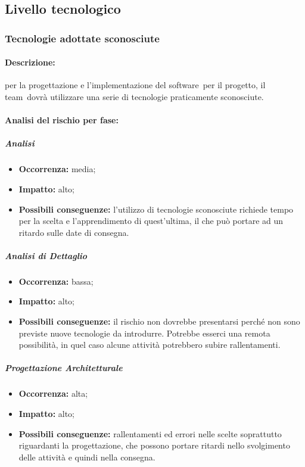 \documentclass[../PianoProgetto.tex]{subfiles}
\begin{document}
\newpage
\subsection{Livello tecnologico}

\subsubsection{Tecnologie adottate sconosciute}
\label{sec:Tecnologie adottate sconosciute}

	\paragraph*{Descrizione:} per la progettazione e l'implementazione del software\g\ per il progetto, il team\g\ dovrà utilizzare una serie di tecnologie praticamente sconosciute.
	
	\paragraph*{Analisi del rischio per fase:} 

		\subparagraph*{Analisi}
			\begin{itemize}[label={-}]
				\item \textbf{Occorrenza:} media;
				\item \textbf{Impatto:} alto;
				\item \textbf{Possibili conseguenze:} l'utilizzo di tecnologie sconosciute richiede tempo per la scelta e l'apprendimento di quest'ultima, il che può portare ad un ritardo sulle date di consegna.
			\end{itemize}
			
		\subparagraph*{Analisi di Dettaglio}
			\begin{itemize}[label={-}]
				\item \textbf{Occorrenza:} bassa;
				\item \textbf{Impatto:} alto;
				\item \textbf{Possibili conseguenze:} il rischio non dovrebbe presentarsi perché non sono previste nuove tecnologie da introdurre. Potrebbe esserci una remota possibilità, in quel caso alcune attività potrebbero subire rallentamenti.
			\end{itemize}
			
		\subparagraph*{Progettazione Architetturale}
			\begin{itemize}[label={-}]
				\item \textbf{Occorrenza:} alta;
				\item \textbf{Impatto:} alto;
				\item \textbf{Possibili conseguenze:} rallentamenti ed errori nelle scelte soprattutto riguardanti la progettazione, che possono portare ritardi nello svolgimento delle attività e quindi nella consegna.
			\end{itemize}
			
\end{document}
